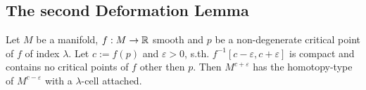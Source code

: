 \subsection{The second Deformation Lemma}

\begin{theorem}
   \label{theorem:2nd deformation lemma}
   Let $M$ be a manifold, $f: M \rightarrow {\mathbb R}$ smooth and $p$ be a 
   non-degenerate critical point of $f$ of index $\lambda$. Let $c := f(p)$ and 
   $\varepsilon > 0$, s.th. $f^{-1}[c-\varepsilon, c+\varepsilon]$ is compact 
   and contains no critical points of $f$ other then $p$. Then 
   $M^{c+\varepsilon}$ has the homotopy-type of  $M^{c-\varepsilon}$ with a 
   $\lambda$-cell attached.
\end{theorem}
 
